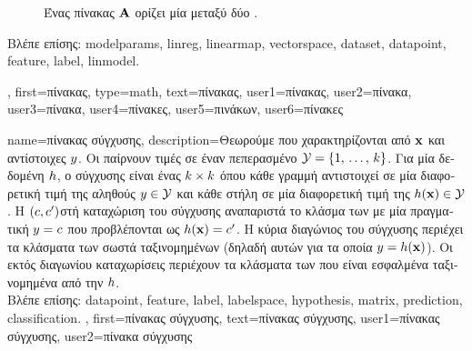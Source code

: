 {{\begin{figure}[H]
		{
		\caption{\foreignlanguage{greek}{Ένας πίνακας ${\bf A}$ ορίζει μία}  \foreignlanguage{greek}{μεταξύ 
		δύο} . \label{fig_matrix_dict}} }
		\end{figure}
		\foreignlanguage{greek}{Βλέπε επίσης:} \gls{modelparams}, \gls{linreg}, \gls{linearmap}, \gls{vectorspace}, \gls{dataset}, 
		\gls{datapoint}, \gls{feature}, \gls{label}, \gls{linmodel}. },
	first={\foreignlanguage{greek}{πίνακας}},
	type=math,
	text={\foreignlanguage{greek}{πίνακας}},
	user1={\foreignlanguage{greek}{πίνακας}}, %
	user2={\foreignlanguage{greek}{πίνακα}}, %
	user3={\foreignlanguage{greek}{πίνακα}}, %
	user4={\foreignlanguage{greek}{πίνακες}}, %
	user5={\foreignlanguage{greek}{πινάκων}}, %
	user6={\foreignlanguage{greek}{πίνακες}} %
}

{name={\foreignlanguage{greek}{πίνακας σύγχυσης}}, 
	description={\foreignlanguage{greek}{Θεωρούμε}   
		\foreignlanguage{greek}{που χαρακτηρίζονται από}  ${\bf x}$ \foreignlanguage{greek}{και 
		αντίστοιχες}  $y$. \foreignlanguage{greek}{Οι}   
		\foreignlanguage{greek}{παίρνουν τιμές σε έναν πεπερασμένο}  $\mathcal{Y} = \{1, \,\ldots, \,k\}$. 
		\foreignlanguage{greek}{Για μία δεδομένη}  $h$, \foreignlanguage{greek}{ο} 
		 \foreignlanguage{greek}{σύγχυσης είναι ένας $k \times k$} 
		 \foreignlanguage{greek}{όπου κάθε γραμμή αντιστοιχεί σε μία διαφορετική τιμή της αληθούς} 
		 $y \in \mathcal{Y}$ \foreignlanguage{greek}{και κάθε στήλη σε μία διαφορετική τιμή της}  
		 $h({\bf x}) \in \mathcal{Y}$. \foreignlanguage{greek}{Η $(c,c')$στή 
		καταχώριση του}  \foreignlanguage{greek}{σύγχυσης αναπαριστά το κλάσμα των}  
		\foreignlanguage{greek}{με μία πραγματική}  $y = c$ \foreignlanguage{greek}{που προβλέπονται ως  
		$h({\bf x}) = c'$. Η κύρια διαγώνιος του}  \foreignlanguage{greek}{σύγχυσης 
		περιέχει τα κλάσματα των σωστά ταξινομημένων}  (\foreignlanguage{greek}{δηλαδή αυτών για 
		τα οποία $y = h({\bf x})$). Οι εκτός διαγωνίου καταχωρίσεις περιέχουν τα κλάσματα των} 
		 \foreignlanguage{greek}{που είναι εσφαλμένα ταξινομημένα από την} $h$. \\
		\foreignlanguage{greek}{Βλέπε επίσης:} \gls{datapoint}, \gls{feature}, \gls{label}, \gls{labelspace}, \gls{hypothesis}, \gls{matrix}, 
		\gls{prediction}, \gls{classification}. },
	first={\foreignlanguage{greek}{πίνακας σύγχυσης}},
	text={\foreignlanguage{greek}{πίνακας σύγχυσης}},
	user1={\foreignlanguage{greek}{πίνακας σύγχυσης}}, %
	user2={\foreignlanguage{greek}{πίνακα σύγχυσης}} %
}

